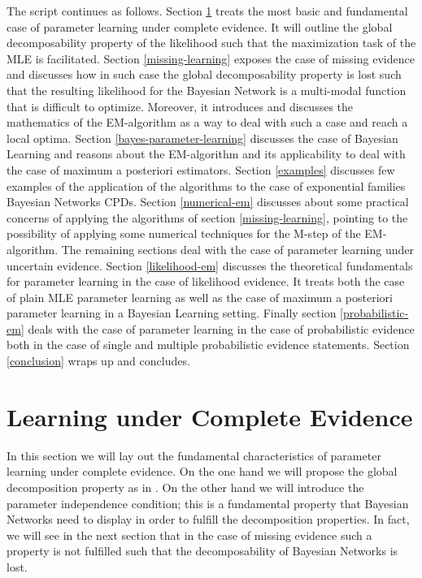 \documentclass[11pt]{article}
\begin{document}
\begin{article}
The script continues as follows. Section \ref{complete-learning}
treats the most basic and fundamental case of parameter learning
under complete evidence. It will outline the global decomposability
property of the likelihood such that the maximization task of the
MLE is facilitated. Section \ref{missing-learning} exposes the case of
missing evidence and discusses how in such case the global
decomposability property is lost such that the resulting likelihood
for the Bayesian Network is a multi-modal function that is
difficult to optimize. Moreover, it introduces and discusses the
mathematics of the EM-algorithm as a way to deal with such a case
and reach a local optima. Section \ref{bayes-parameter-learning}
discusses the case of Bayesian Learning and reasons about the
EM-algorithm and its applicability to deal with the case of maximum
a posteriori estimators. Section \ref{examples} discusses few examples
of the application of the algorithms to the case of exponential
families Bayesian Networks CPDs.  Section \ref{numerical-em} discusses
about some practical concerns of applying the algorithms of section
\ref{missing-learning}, pointing to the possibility of applying some
numerical techniques for the M-step of the EM-algorithm. The
remaining sections deal with the case of parameter learning under
uncertain evidence. Section \ref{likelihood-em} discusses the
theoretical fundamentals for parameter learning in the case of
likelihood evidence. It treats both the case of plain MLE parameter
learning as well as the case of maximum a posteriori parameter
learning in a Bayesian Learning setting. Finally section
\ref{probabilistic-em} deals with the case of parameter learning in the
case of probabilistic evidence both in the case of single and
multiple probabilistic evidence statements. Section \ref{conclusion}
wraps up and concludes.

\newpage


\section{Learning under Complete Evidence}
\label{complete-learning}
In this section we will lay out the fundamental characteristics of
parameter learning under complete evidence. On the one hand we will
propose the global decomposition property as in
\cite{spiegelhalter1990sequential}. On the other hand we will
introduce the parameter independence condition; this is a
fundamental property that Bayesian Networks need to display in order
to fulfill the decomposition properties. In fact, we will see in the
next section that in the case of missing evidence such a property is
not fulfilled such that the decomposability of Bayesian Networks is
lost.


\end{article}
\end{document}
